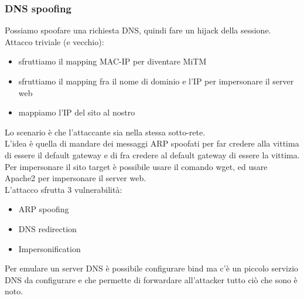 \documentclass[12pt, oneside]{extbook} %
\begin{document}
\subsubsection{DNS spoofing}
Possiamo spoofare una richiesta DNS, quindi fare un hijack della sessione. Attacco triviale (e vecchio):
\begin{itemize}
\item sfruttiamo il mapping MAC-IP per diventare MiTM
\item sfruttiamo il mapping fra il nome di dominio e l'IP per impersonare il server web
\item mappiamo l'IP del sito al nostro
\end{itemize}
Lo scenario è che l'attaccante sia nella stessa sotto-rete.\\ L'idea è quella di mandare dei messaggi ARP spoofati per far credere alla vittima di essere il default gateway e di fra credere al default gateway di essere la vittima.\\ Per impersonare il sito target è possibile usare il comando \textsf{wget}, ed usare Apache2 per impersonare il server web.\\ L'attacco sfrutta 3 vulnerabilità:
\begin{itemize}
\item ARP spoofing
\item DNS redirection
\item Impersonification
\end{itemize}
Per emulare un server DNS è possibile configurare bind ma c'è un piccolo servizio DNS da configurare e che permette di forwardare all'attacker tutto ciò che sono è noto.
\end{document}
